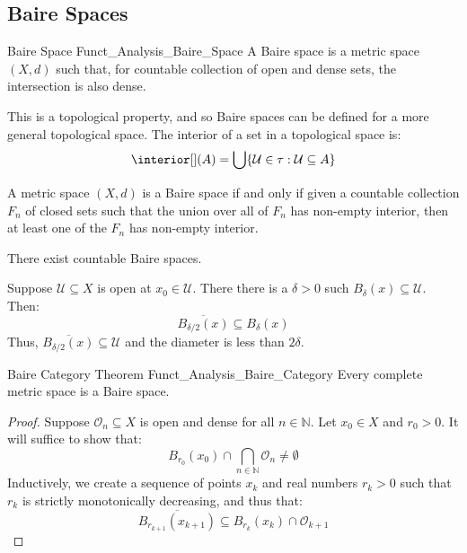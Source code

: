         \subsection{Baire Spaces}
            \begin{ldefinition}{Baire Space}
                  {Funct_Analysis_Baire_Space}
            A Baire space is a metric space $(X,d)$ such that, for
            countable collection of open and dense sets, the
            intersection is also dense.
        \end{ldefinition}
            This is a topological property, and so Baire spaces can
            be defined for a more general topological space. The
            interior of a set in a topological space is:
            \begin{equation}
            \interior[](A)=
            \bigcup\{\mathcal{U}\in\tau:\mathcal{U}\subseteq{A}\}
        \end{equation}
            \begin{theorem}
            A metric space $(X,d)$ is a Baire space if and only
            if given a countable collection $F_{n}$ of closed
            sets such that the union over all of $F_{n}$ has
            non-empty interior, then at least one of the $F_{n}$
            has non-empty interior.
            \end{theorem}
            \begin{theorem}
                There exist countable Baire spaces.
            \end{theorem}
            Suppose $\mathcal{U}\subseteq{X}$ is open at
            $x_{0}\in\mathcal{U}$. There there is a $\delta>0$ such
            $B_{\delta}(x)\subseteq\mathcal{U}$. Then:
            \begin{equation}
                \overline{B_{\delta/2}(x)}\subseteq{B}_{\delta}(x)
            \end{equation}
            Thus, $\overline{B_{\delta/2}(x)}\subseteq\mathcal{U}$
            and the diameter is less than $2\delta$.
            \begin{ltheorem}{Baire Category Theorem}
                  {Funct_Analysis_Baire_Category}
                Every complete metric space is a Baire space.
            \end{ltheorem}
            \begin{proof}
            Suppose $\mathcal{O}_{n}\subseteq{X}$ is open and
            dense for all $n\in\mathbb{N}$. Let $x_{0}\in{X}$ and
            $r_{0}>0$. It will suffice to show that:
            \begin{equation}
                B_{r_{0}}(x_{0})\cap\bigcap_{n\in\mathbb{N}}
                    \mathcal{O}_{n}\ne\emptyset
            \end{equation}
            Inductively, we create a sequence of points $x_{k}$
            and real numbers $r_{k}>0$ such that $r_{k}$ is strictly
            monotonically decreasing, and thus that:
            \begin{equation}
                \overline{B_{r_{k+1}}(x_{k+1})}
                \subseteq{B}_{r_{k}}(x_{k})\cap\mathcal{O}_{k+1}
            \end{equation}
        \end{proof}

